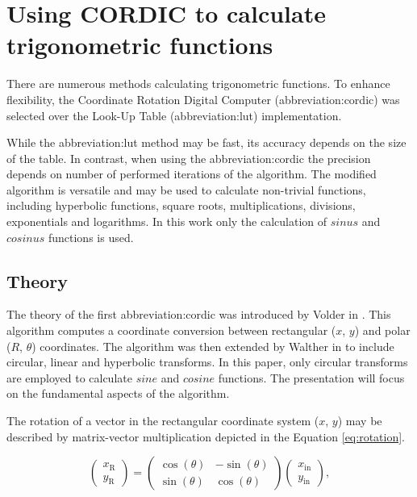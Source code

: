 \documentclass[a4paper, twoside, 11pt]{article}
\begin{document}
\section{Using CORDIC to calculate trigonometric functions}\label{sec:using-cordic-to-calculate-trigonometric-functions}
    There are numerous methods calculating trigonometric functions. To enhance flexibility, the Coordinate Rotation Digital Computer (\gls{abbreviation:cordic}) was selected over the Look-Up Table (\gls{abbreviation:lut}) implementation.\par
    While the \gls{abbreviation:lut} method may be fast, its accuracy depends on the size of the table. In contrast, when using the \gls{abbreviation:cordic} the precision depends on number of performed iterations of the algorithm. The modified algorithm is versatile and may be used to calculate non-trivial functions, including hyperbolic functions, square roots, multiplications, divisions, exponentials and logarithms. \cite{base-digital-signal-processing-with-field-programmable-gate-arrays} In this work only the calculation of $sinus$ and $cosinus$ functions is used.
    \subsection{Theory}\label{subsec:cordic-theory}
        The theory of the first \gls{abbreviation:cordic} was introduced by Volder in \cite{volder-cordic-trigonomtric-computing-technique}. This algorithm computes a coordinate conversion between rectangular ($x$, $y$) and polar ($R$, $\theta$) coordinates. The algorithm was then extended by Walther in \cite{walther-a-unified-algorithm-for-elementary-functions} to include circular, linear and hyperbolic transforms.  In this paper, only circular transforms are employed to calculate  $sine$ and $cosine$ functions. The presentation will focus on the fundamental aspects of the algorithm.\par
        The rotation of a vector in the rectangular coordinate system ($x$, $y$) may be described by matrix-vector multiplication depicted in the Equation \ref{eq:rotation}.

        \begin{equation}\label{eq:rotation}
             \begin{pmatrix}
                 x_\text{R}\\
                 y_\text{R}
             \end{pmatrix}
             =
             \begin{pmatrix}
                 \cos (\theta) & -\sin (\theta)\\
                 \sin (\theta) & \cos (\theta)
             \end{pmatrix}
             \begin{pmatrix}
                 x_\text{in}\\
                 y_\text{in}
             \end{pmatrix},
        \end{equation}
\end{document}

